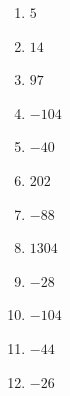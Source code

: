 %
%
    \begin{enumerate}[cols=4]
        \item \(5\)
        \item \(14\)
        \item \(97\)
        \item \(-104\)
        \item \(-40\)
        \item \(202\)
        \item \(-88\)
        \item \(1304\)
        \item \(-28\)
        \item \(-104\)
        \item \(-44\)
        \item \(-26\)
    \end{enumerate}
